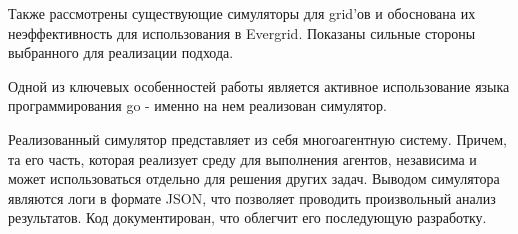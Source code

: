 Также рассмотрены существующие симуляторы для grid'ов и обоснована их неэффективность для использования в Evergrid. Показаны сильные стороны выбранного для реализации подхода.

Одной из ключевых особенностей работы является активное использование языка программирования go - именно на нем реализован симулятор.

Реализованный симулятор представляет из себя многоагентную систему. Причем, та его часть, которая реализует среду для выполнения агентов, независима и может использоваться отдельно для решения других задач. Выводом симулятора являются логи в формате JSON, что позволяет проводить произвольный анализ результатов. Код документирован, что облегчит его последующую разработку.